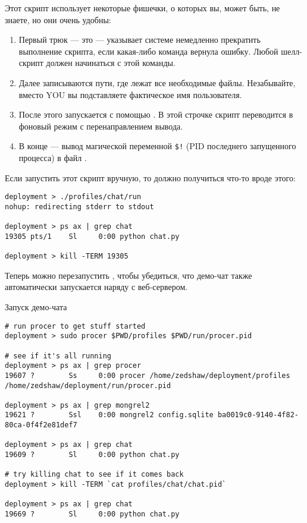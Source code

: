 Этот скрипт использует некоторые фишечки, о которых вы, может быть, не знаете,
но они очень удобны:

\begin{enumerate}
\item Первый трюк --- это  --- указывает системе немедленно
    прекратить выполнение скрипта, если какая-либо команда вернула ошибку. Любой
    шелл-скрипт должен начинаться с этой команды.
\item Далее записываются пути, где лежат все необходимые файлы. Незабывайте,
    вместо YOU вы подставляете фактическое имя пользователя.
\item После этого запускается  с помощью . В этой
    строчке скрипт переводится в фоновый режим с перенаправлением вывода.
\item В конце --- вывод магической переменной \verb|$!| (PID последнего
    запущенного процесса) в файл .
\end{enumerate}

Если запустить этот скрипт вручную, то должно получиться что-то вроде этого:

\begin{lstlisting}
deployment > ./profiles/chat/run
nohup: redirecting stderr to stdout

deployment > ps ax | grep chat
19305 pts/1    Sl     0:00 python chat.py

deployment > kill -TERM 19305
\end{lstlisting}

Теперь можно перезапустить , чтобы убедиться, что демо-чат также
автоматически запускается наряду с веб-сервером.

\begin{code}{Запуск демо-чата}
\begin{lstlisting}
# run procer to get stuff started
deployment > sudo procer $PWD/profiles $PWD/run/procer.pid

# see if it's all running
deployment > ps ax | grep procer
19607 ?        Ss     0:00 procer /home/zedshaw/deployment/profiles /home/zedshaw/deployment/run/procer.pid

deployment > ps ax | grep mongrel2
19621 ?        Ssl    0:00 mongrel2 config.sqlite ba0019c0-9140-4f82-80ca-0f4f2e81def7

deployment > ps ax | grep chat
19609 ?        Sl     0:00 python chat.py

# try killing chat to see if it comes back
deployment > kill -TERM `cat profiles/chat/chat.pid`

deployment > ps ax | grep chat
19669 ?        Sl     0:00 python chat.py
\end{lstlisting}
\end{code}

